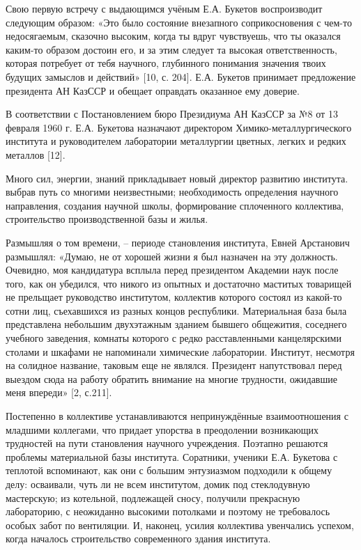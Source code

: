 \begin{multicols}{2}
Свою первую встречу с выдающимся учёным Е.А. Букетов воспроизводит
следующим образом: «Это было состояние внезапного соприкосновения с
чем-то недосягаемым, сказочно высоким, когда ты вдруг чувствуешь, что ты
оказался каким-то образом достоин его, и за этим следует та высокая
ответственность, которая потребует от тебя научного, глубинного
понимания значения твоих будущих замыслов и действий» {[}10, с. 204{]}.
Е.А. Букетов принимает предложение президента АН КазССР и обещает
оправдать оказанное ему доверие.

В соответствии с Постановлением бюро Президиума АН КазССР за №8 от 13
февраля 1960 г. Е.А. Букетова назначают директором
Химико-металлургического института и руководителем лаборатории
металлургии цветных, легких и редких металлов {[}12{]}.

Много сил, энергии, знаний прикладывает новый директор развитию
института. выбрав путь со многими неизвестными; необходимость
определения научного направления, создания научной школы, формирование
сплоченного коллектива, строительство производственной базы и жилья.

Размышляя о том времени, -- периоде становления института, Евней
Арстанович размышлял: «Думаю, не от хорошей жизни я был назначен на эту
должность. Очевидно, моя кандидатура всплыла перед президентом Академии
наук после того, как он убедился, что никого из опытных и достаточно
маститых товарищей не прельщает руководство институтом, коллектив
которого состоял из какой-то сотни лиц, съехавшихся из разных концов
республики. Материальная база была представлена небольшим двухэтажным
зданием бывшего общежития, соседнего учебного заведения, комнаты
которого с редко расставленными канцелярскими столами и шкафами не
напоминали химические лаборатории. Институт, несмотря на солидное
название, таковым еще не являлся. Президент напутствовал перед выездом
сюда на работу обратить внимание на многие трудности, ожидавшие меня
впереди» {[}2, с.211{]}.

Постепенно в коллективе устанавливаются непринуждённые взаимоотношения с
младшими коллегами, что придает упорства в преодолении возникающих
трудностей на пути становления научного учреждения. Поэтапно решаются
проблемы материальной базы института. Соратники, ученики Е.А. Букетова с
теплотой вспоминают, как они с большим энтузиазмом подходили к общему
делу: осваивали, чуть ли не всем институтом, домик под стеклодувную
мастерскую; из котельной, подлежащей сносу, получили прекрасную
лабораторию, с неожиданно высокими потолками и поэтому не требовалось
особых забот по вентиляции. И, наконец, усилия коллектива увенчались
успехом, когда началось строительство современного здания института.


\end{multicols}
